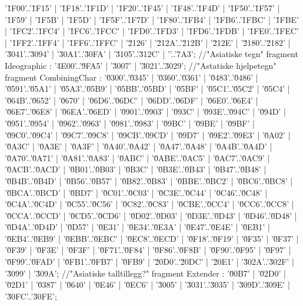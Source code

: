 '\u1F00'..'\u1F15' | '\u1F18'..'\u1F1D' | '\u1F20'..'\u1F45' | '\u1F48'..'\u1F4D' | '\u1F50'..'\u1F57' | '\u1F59' | '\u1F5B' | '\u1F5D' | '\u1F5F'..'\u1F7D' | '\u1F80'..'\u1FB4' | '\u1FB6'..'\u1FBC' | '\u1FBE' | '\u1FC2'..'\u1FC4' | '\u1FC6'..'\u1FCC' | '\u1FD0'..'\u1FD3' | '\u1FD6'..'\u1FDB' | '\u1FE0'..'\u1FEC' | '\u1FF2'..'\u1FF4' | '\u1FF6'..'\u1FFC' | '\u2126' | '\u212A'..'\u212B' | '\u212E' | '\u2180'..'\u2182' | '\u3041'..'\u3094' | '\u30A1'..'\u30FA' | '\u3105'..'\u312C' | ''..'\uD7A3';
//"Asiatiske tegn"
fragment Ideographic              : '\u4E00'..'\u9FA5' | '\u3007' | '\u3021'..'\u3029'; 
//"Astatiske hjelpetegn"
fragment CombiningChar             : '\u0300'..'\u0345' | '\u0360'..'\u0361' | '\u0483'..'\u0486' | '\u0591'..'\u05A1' | '\u05A3'..'\u05B9' | '\u05BB'..'\u05BD' | '\u05BF' | '\u05C1'..'\u05C2' | '\u05C4' | '\u064B'..'\u0652' | '\u0670' | '\u06D6'..'\u06DC' | '\u06DD'..'\u06DF' | '\u06E0'..'\u06E4' | '\u06E7'..'\u06E8' | '\u06EA'..'\u06ED' | '\u0901'..'\u0903' | '\u093C' | '\u093E'..'\u094C' | '\u094D' | '\u0951'..'\u0954' | '\u0962'..'\u0963' | '\u0981'..'\u0983' | '\u09BC' | '\u09BE' | '\u09BF' | '\u09C0'..'\u09C4' | '\u09C7'..'\u09C8' | '\u09CB'..'\u09CD' | '\u09D7' | '\u09E2'..'\u09E3' | '\u0A02' | '\u0A3C' | '\u0A3E' | '\u0A3F' | '\u0A40'..'\u0A42' | '\u0A47'..'\u0A48' | '\u0A4B'..'\u0A4D' | '\u0A70'..'\u0A71' | '\u0A81'..'\u0A83' | '\u0ABC' | '\u0ABE'..'\u0AC5' | '\u0AC7'..'\u0AC9' | '\u0ACB'..'\u0ACD' | '\u0B01'..'\u0B03' | '\u0B3C' | '\u0B3E'..'\u0B43' | '\u0B47'..'\u0B48' | '\u0B4B'..'\u0B4D' | '\u0B56'..'\u0B57' | '\u0B82'..'\u0B83' | '\u0BBE'..'\u0BC2' | '\u0BC6'..'\u0BC8' | '\u0BCA'..'\u0BCD' | '\u0BD7' | '\u0C01'..'\u0C03' | '\u0C3E'..'\u0C44' | '\u0C46'..'\u0C48' | '\u0C4A'..'\u0C4D' | '\u0C55'..'\u0C56' | '\u0C82'..'\u0C83' | '\u0CBE'..'\u0CC4' | '\u0CC6'..'\u0CC8' | '\u0CCA'..'\u0CCD' | '\u0CD5'..'\u0CD6' | '\u0D02'..'\u0D03' | '\u0D3E'..'\u0D43' | '\u0D46'..'\u0D48' | '\u0D4A'..'\u0D4D' | '\u0D57' | '\u0E31' | '\u0E34'..'\u0E3A' | '\u0E47'..'\u0E4E' | '\u0EB1' | '\u0EB4'..'\u0EB9' | '\u0EBB'..'\u0EBC' | '\u0EC8'..'\u0ECD' | '\u0F18'..'\u0F19' | '\u0F35' | '\u0F37' | '\u0F39' | '\u0F3E' | '\u0F3F' | '\u0F71'..'\u0F84' | '\u0F86'..'\u0F8B' | '\u0F90'..'\u0F95' | '\u0F97' | '\u0F99'..'\u0FAD' | '\u0FB1'..'\u0FB7' | '\u0FB9' | '\u20D0'..'\u20DC' | '\u20E1' | '\u302A'..'\u302F' | '\u3099' | '\u309A';
//"Asiatiske talltillegg?"
fragment Extender                  : '\u00B7' | '\u02D0' | '\u02D1' | '\u0387' | '\u0640' | '\u0E46' | '\u0EC6' | '\u3005' | '\u3031'..'\u3035' | '\u309D'..'\u309E' | '\u30FC'..'\u30FE';
